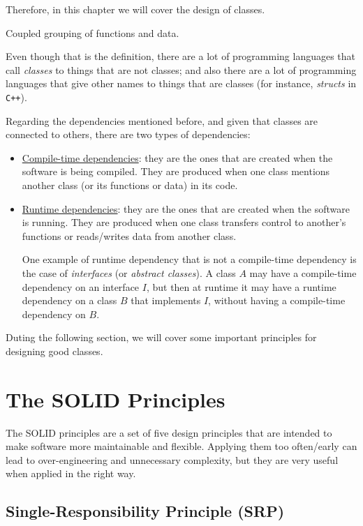 Therefore, in this chapter we will cover the design of classes.
\begin{definicion}[Class]
    Coupled grouping of functions and data.
\end{definicion}
\begin{observacion}
    Even though that is the definition, there are a lot of programming languages that call \emph{classes} to things that are not classes; and also there are a lot of programming languages that give other names to things that are classes (for instance, \emph{structs} in \verb|C++|).
\end{observacion}

Regarding the dependencies mentioned before, and given that classes are connected to others, there are two types of dependencies:
\begin{itemize}
    \item \ul{Compile-time dependencies}: they are the ones that are created when the software is being compiled. They are produced when one class mentions another class (or its functions or data) in its code.
    \item \ul{Runtime dependencies}: they are the ones that are created when the software is running. They are produced when one class transfers control to another's functions or reads/writes data from another class.
    
    One example of runtime dependency that is not a compile-time dependency is the case of \emph{interfaces} (or \emph{abstract classes}). A class $A$ may have a compile-time dependency on an interface $I$, but then at runtime it may have a runtime dependency on a class $B$ that implements $I$, without having a compile-time dependency on $B$.
\end{itemize}

Duting the following section, we will cover some important principles for designing good classes.

\section{The SOLID Principles}

The SOLID principles are a set of five design principles that are intended to make software more maintainable and flexible. Applying them too often/early can lead to over-engineering and unnecessary complexity, but they are very useful when applied in the right way.

\subsection{Single-Responsibility Principle (SRP)}

